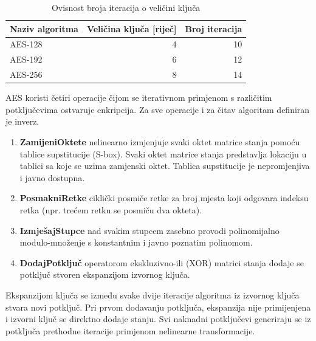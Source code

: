 \documentclass[times, utf8, numeric, diplomski]{fer}
\def\todoeq#1{\textcolor{red}{\begin{equation}\text{\big[EQUATION: \textit{#1}\big]}\end{equation}}}
\begin{document}
\begin{table}[H]
\begin{tabular}{lrr}
Naziv algoritma & Veličina ključa [riječ] & Broj iteracija \\
\hline
AES-128 & 4 & 10 \\
AES-192 & 6 & 12 \\
AES-256 & 8 & 14
\end{tabular}
\centering
\caption{Ovisnost broja iteracija o veličini ključa}
\label{tab:aes_rounds}
\end{table}

AES koristi četiri operacije čijom se iterativnom primjenom s različitim potključevima ostvaruje enkripcija. Za sve operacije i za čitav algoritam definiran je inverz.
\begin{enumerate}
\item
\textbf{ZamijeniOktete} nelinearno izmjenjuje svaki oktet matrice stanja pomoću tablice supstitucije (S-box). Svaki oktet matrice stanja predstavlja lokaciju u tablici sa koje se uzima zamjenski oktet. Tablica supstitucije je nepromjenjiva i javno dostupna.

\item
\textbf{PosmakniRetke} ciklički posmiče retke za broj mjesta koji odgovara indeksu retka (npr. trećem retku se posmiču dva okteta).

\item
\textbf{IzmješajStupce} nad svakim stupcem zasebno provodi polinomijalno modulo-množenje s konstantnim i javno poznatim polinomom. 

\item
\textbf{DodajPotključ} operatorom ekskluzivno-ili (XOR) matrici stanja dodaje se potključ stvoren ekspanzijom izvornog ključa.
\end{enumerate}

Ekspanzijom ključa se između svake dvije iteracije algoritma iz izvornog ključa stvara novi potključ. Pri prvom dodavanju potključa, ekspanzija nije primijenjena i izvorni ključ se direktno dodaje stanju. Svi naknadni potključevi generiraju se iz potključa prethodne iteracije primjenom nelinearne transformacije.


\end{document}

